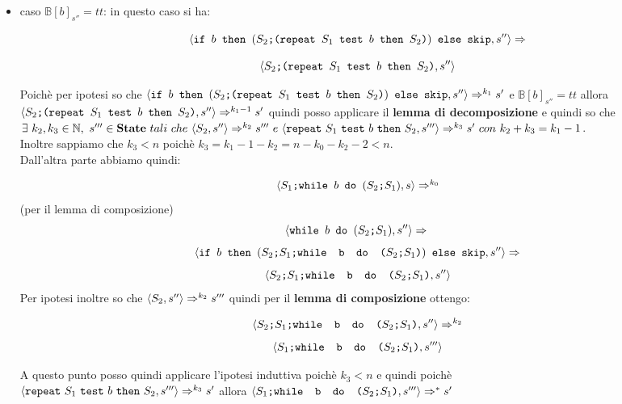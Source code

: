 {\begin{itemize}
		Quindi dall'altra parte dell'implicazione si ha:
		\begin{center}
		$\confSs{\PDef{}}{s}\Rar{k_0}$ (per il lemma di composizione)\\
		$\confSs{\wbS{b}{(\concat{$S_2$}{$S_1$})}}{s''}$
		\end{center}
		Poichè per ipotesi sappiamo che $\confSs{S_1}{s}\Rar{k_0}s''$. Inoltre
		sempre per ipotesi abbiamo che $\mathbb{B}[b]_{s''}=ff$, quindi:
		\begin{center}
		$\confSs{\wbS{b}{(\concat{$S_2$}{$S_1$})}}{s''}\Rar{}$\\
		$\confSs{\ifABC{b}{(\concat{$S_2$}{(\concat{$S_1$}
		{\wbS{b}{(\concat{$S_2$}{$S_1$})}})})}{\skipistr}}{s''}\Rar{}$\\
		$\confSs{\skipistr}{s''}\Rar{}s''$
		\end{center}
		Ottenedo lo stesso stato finale quindi dell'implicazione di partenza.

		\item caso $\mathbb{B}[b]_{s''}=tt$: in questo caso si ha:

		\[ \confSs{\ifABC{b}{(\concat{$S_2$}{(\repeatSbS{$S_1$}{$b$}{$S_2$})})}
		{\skipistr}}{s''}\Rar{} \]
	
		\[ \confSs{\concat{$S_2$}{(\repeatSbS{$S_1$}{$b$}{$S_2$})}}{s''} \]

		Poichè per ipotesi so che $\confSs{\ifABC{b}{(\concat{$S_2$}
		{(\repeatSbS{$S_1$}{$b$}{$S_2$})})}{\skipistr}}{s''}\Rar{k_1}s'$ e 
		$\mathbb{B}[b]_{s''}=tt$ allora 
		$\confSs{\concat{$S_2$}{(\repeatSbS{$S_1$}{$b$}{$S_2$})}}{s''}
		\Rar{k_1-1}s'$ quindi posso applicare il \textbf{lemma di 
		decomposizione} e quindi so che $\exists{}~k_2,k_3\in{}\mathbb{N},~
		s'''\in{}\states{}~tali~che~\confSs{S_2}{s''}\Rar{k_2}s'''~e
		~\confSs{\repeatSbS{S_1}{b}{S_2}}{s'''}\Rar{k_3}s'~con~
		k_2+k_3=k_1-1$.\\
		Inoltre sappiamo che $k_3<n$ poichè $k_3=k_1-1-k_2=n-k_0-k_2-2<n$.\\
		Dall'altra parte abbiamo quindi:
	
		\[ \confSs{\PDef{}}{s}\Rar{k_0}\] (per il lemma di composizione)\\
		\[\confSs{\wbS{b}{(\concat{$S_2$}{$S_1$})}}{s''}\Rar{}\\ \]
		\[\confSs{\ifABC{b}{(\concat{\concat{$S_2$}{$S_1$}}
		{\wbS{b}{(\concat{$S_2$}{$S_1$})}})}{\skipistr}}{s''}\Rar{}\]
		\[\confSs{\concat{\concat{$S_2$}{$S_1$}}
		{\wbS{b}{(\concat{$S_2$}{$S_1$})}}}{s''}\]
		Per ipotesi inoltre so che $\confSs{S_2}{s''}\Rar{k_2}s'''$ quindi per
		il \textbf{lemma di composizione} ottengo:
	
		\[ \confSs{\concat{\concat{$S_2$}{$S_1$}}
		{\wbS{b}{(\concat{$S_2$}{$S_1$})}}}{s''}\Rar{k_2} \]
	\[ 	\confSs{\concat{$S_1$}{\wbS{b}{(\concat{$S_2$}{$S_1$})}}}{s'''} \]

		A questo punto posso quindi applicare l'ipotesi induttiva poichè $k_3<n$
		e quindi poichè \\$\confSs{\repeatSbS{S_1}{b}{S_2}}{s'''}\Rar{k_3}s'$
		allora 
		$\confSs{\concat{$S_1$}{\wbS{b}{(\concat{$S_2$}{$S_1$})}}}{s'''}
		\Rar{*}s'$

	\end{itemize}
}
\newpage